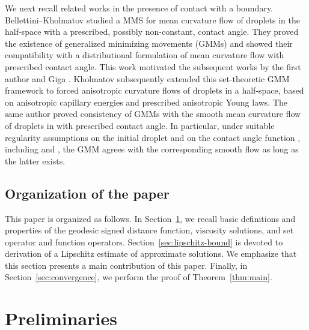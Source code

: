 \documentclass[11pt]{article}
\makeatletter
\numberwithin{equation}{section}
\newcommand{\R}{\mathbb{R}}
\newcounter{mathrecordid}
\newcommand{\mathboxbegin}[1]{%
  \stepcounter{mathrecordid}%
  \immediate\write\mathrecords{\themathrecordid,#1}%
  \special{pdf:bann << /Type /Annot /Subtype /Link /Border [0 0 0]
    /MathBoxID \themathrecordid /F 2
    /A << /S /URI /URI (urn:mathbox:\themathrecordid) >> >>}}
\newcommand{\mathboxinlineplain}[1]{$#1$}
\newcommand{\mathboxinline}[1]{%
  $\mathboxbegin{inline}%
  \special{pdf:literal direct /MathBoxBegin\themathrecordid\space MP}%
  #1\special{pdf:literal direct /MathBoxEnd\themathrecordid\space MP}%
  \special{pdf:eann}$}
\newcommand{\recordmath}{%
  \ifmeasuring@\expandafter\mathboxinlineplain
  \else\expandafter\mathboxinline\fi}
\makeatother
\begin{document}
We next recall related works in the presence of contact with a boundary.
Bellettini--Kholmatov \cite{BK18} studied a MMS for mean curvature flow of droplets in the half-space \recordmath{\mathbb{R}^d_+} with a prescribed, possibly non-constant, contact angle.  They proved the existence of generalized minimizing movements (GMMs) and showed their compatibility with a distributional formulation of mean curvature flow with prescribed contact angle.  This work motivated the subsequent works by the first author and Giga \cite{EG24,EG25}.
Kholmatov \cite{K25-2} subsequently extended this set-theoretic GMM framework to forced anisotropic curvature flows of droplets in a half-space, based on anisotropic capillary energies and prescribed anisotropic Young laws.
The same author \cite{Kholmatov25} proved consistency of GMMs with the smooth mean curvature flow of droplets in \recordmath{\mathbb{R}^3_+} with prescribed contact angle.  In particular, under suitable regularity assumptions on the initial droplet and on the contact angle function \recordmath{\beta}, including \recordmath{\beta\in C^{1+\alpha}(\partial\R^3_+)} and \recordmath{\|\beta\|_{C^0(\partial\R^3_+)}<1}, the GMM agrees with the corresponding smooth flow as long as the latter exists.



\subsection*{Organization of the paper}
This paper is organized as follows. In Section~\ref{sec:preliminaries},
we recall basic definitions and properties of the geodesic signed distance function, viscosity solutions, and set operator and function operators. 
Section~\ref{sec:lipschitz-bound} is devoted to derivation of a Lipschitz estimate of approximate solutions. We emphasize that this section presents a main contribution of this paper.
Finally, in Section~\ref{sec:convergence}, we perform the proof of Theorem~\ref{thm:main}.

\section{Preliminaries}
\label{sec:preliminaries}
\end{document}
